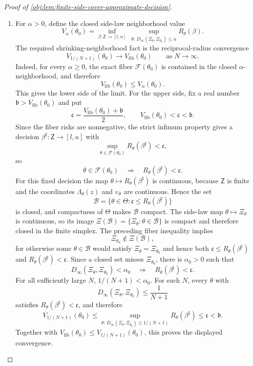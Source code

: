 \begin{proof}[Proof of \cref{obj:lem:finite-side-cover-approximate-decision}]
\begin{enumerate}
\item For \(\alpha>0\), define the closed side-law neighborhood value
\[
V_\alpha(\theta_0)
=
\inf_{\beta:\mathsf Z\to[l,u]}\ 
\sup_{\theta:\,D_\infty(\Xi_\theta,\Xi_{\theta_0})\le \alpha} R_\theta(\beta).
\]
The required shrinking-neighborhood fact is the reciprocal-radius convergence
\[
V_{1/(N+1)}(\theta_0)\longrightarrow V_{\mathrm{fib}}(\theta_0)
\qquad\text{as }N\to\infty .
\]
Indeed, for every \(\alpha\ge0\), the exact fiber \(\mathcal F(\theta_0)\) is contained in the closed \(\alpha\)-neighborhood, and therefore
\[
V_{\mathrm{fib}}(\theta_0)\le V_\alpha(\theta_0).
\]
This gives the lower side of the limit. For the upper side, fix a real number \(\mathfrak b>V_{\mathrm{fib}}(\theta_0)\) and put
\[
\mathfrak c=\frac{V_{\mathrm{fib}}(\theta_0)+\mathfrak b}{2},
\qquad
V_{\mathrm{fib}}(\theta_0)<\mathfrak c<\mathfrak b.
\]
Since the fiber risks are nonnegative, the strict infimum property gives a decision \(\beta^\sharp:\mathsf Z\to[l,u]\) with
\[
\sup_{\theta\in\mathcal F(\theta_0)}R_\theta(\beta^\sharp)<\mathfrak c,
\]
so
\[
\theta\in\mathcal F(\theta_0)
\quad\Longrightarrow\quad
R_\theta(\beta^\sharp)<\mathfrak c.
\]
For this fixed decision the map \(\theta\mapsto R_\theta(\beta^\sharp)\) is continuous, because \(\mathsf Z\) is finite and the coordinates \(\Lambda_\theta(z)\) and \(\upsilon_\theta\) are continuous. Hence the set
\[
\mathcal B=
\{\theta\in\Theta:\mathfrak c\le R_\theta(\beta^\sharp)\}
\]
is closed, and compactness of \(\Theta\) makes \(\mathcal B\) compact. The side-law map \(\theta\mapsto\Xi_\theta\) is continuous, so its image \(\Xi(\mathcal B)=\{\Xi_\theta:\theta\in\mathcal B\}\) is compact and therefore closed in the finite simplex. The preceding fiber inequality implies
\[
\Xi_{\theta_0}\notin \Xi(\mathcal B),
\]
for otherwise some \(\theta\in\mathcal B\) would satisfy \(\Xi_\theta=\Xi_{\theta_0}\) and hence both \(\mathfrak c\le R_\theta(\beta^\sharp)\) and \(R_\theta(\beta^\sharp)<\mathfrak c\). Since a closed set misses \(\Xi_{\theta_0}\), there is \(\alpha_0>0\) such that
\[
D_\infty(\Xi_\theta,\Xi_{\theta_0})<\alpha_0
\quad\Longrightarrow\quad
R_\theta(\beta^\sharp)<\mathfrak c .
\]
For all sufficiently large \(N\), \(1/(N+1)<\alpha_0\). For such \(N\), every \(\theta\) with
\[
D_\infty(\Xi_\theta,\Xi_{\theta_0})\le \frac1{N+1}
\]
satisfies \(R_\theta(\beta^\sharp)<\mathfrak c\), and therefore
\[
V_{1/(N+1)}(\theta_0)
\le
\sup_{\theta:\,D_\infty(\Xi_\theta,\Xi_{\theta_0})\le 1/(N+1)}
R_\theta(\beta^\sharp)
\le \mathfrak c
<\mathfrak b.
\]
Together with \(V_{\mathrm{fib}}(\theta_0)\le V_{1/(N+1)}(\theta_0)\), this proves the displayed convergence.


\end{enumerate}
\end{proof}

